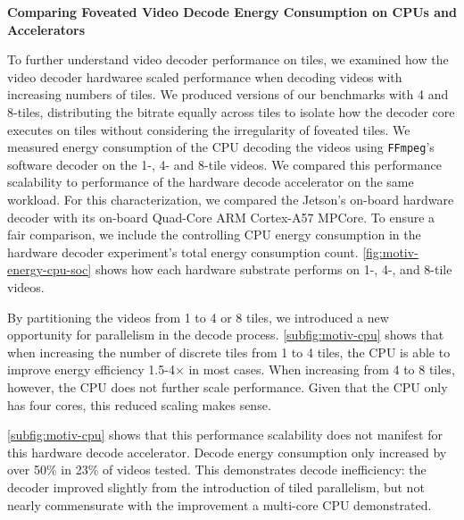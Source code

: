 \motPerceptualEnergy

\textbf{Comparing Foveated Video Decode Energy Consumption on CPUs and Accelerators}

To further understand video decoder performance on tiles, we examined how the video decoder hardwaree scaled performance when decoding videos with increasing numbers of tiles.
We produced versions of our benchmarks with 4 and 8-tiles, distributing the bitrate equally across tiles to isolate how the decoder core executes on tiles without considering the irregularity of foveated tiles.
We measured energy consumption of the CPU decoding the videos using \texttt{FFmpeg}'s software \hevc decoder on the 1-, 4- and 8-tile videos.
We compared this performance scalability to performance of the hardware decode accelerator on the same workload.
For this characterization, we compared the Jetson's on-board hardware decoder with its on-board Quad-Core ARM Cortex-A57 MPCore.
To ensure a fair comparison, we include the controlling CPU energy consumption in the hardware decoder experiment's total energy consumption count.
\ref{fig:motiv-energy-cpu-soc} shows how each hardware substrate performs on 1-, 4-, and 8-tile videos.

By partitioning the videos from 1 to 4 or 8 tiles, we introduced a new opportunity for parallelism in the decode process.
\ref{subfig:motiv-cpu} shows that when increasing the number of discrete tiles from 1 to 4 tiles, the CPU is able to improve energy efficiency 1.5-4$\times$ in most cases.
When increasing from 4 to 8 tiles, however, the CPU does not further scale performance.
Given that the CPU only has four cores, this reduced scaling makes sense.


%
%
\ref{subfig:motiv-cpu} shows that this performance scalability does not manifest for this hardware decode accelerator.
Decode energy consumption only increased by over 50\% in 23\% of videos tested.
This demonstrates decode inefficiency: the decoder improved slightly from the introduction of tiled parallelism, but not nearly commensurate with the improvement a multi-core CPU demonstrated.

